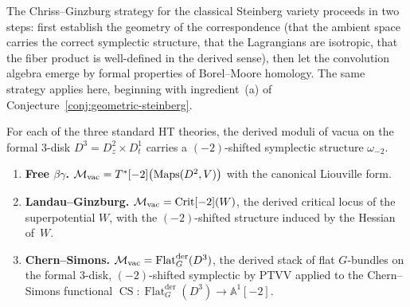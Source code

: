 The Chriss--Ginzburg strategy for the classical Steinberg variety
proceeds in two steps: first establish the geometry of the
correspondence (that the ambient space carries the correct symplectic
structure, that the Lagrangians are isotropic, that the fiber product
is well-defined in the derived sense), then let the convolution
algebra emerge by formal properties of Borel--Moore homology.
The same strategy applies here, beginning with ingredient~(a) of
Conjecture~\ref{conj:geometric-steinberg}.

\begin{proposition}
\label{prop:minus-two-shifted-examples}
\ClaimStatusProvedHere
For each of the three standard HT theories, the derived moduli of
vacua on the formal $3$-disk $D^3 = D^2_z \times D^1_t$ carries a
$(-2)$-shifted symplectic structure $\omega_{-2}$.
\begin{enumerate}[label=\textup{(\roman*)},leftmargin=2em]
\item \textbf{Free $\beta\gamma$.}
 $\mathcal M_{\mathrm{vac}} = T^*[-2]\bigl(\operatorname{Maps}(D^2, V)\bigr)$
 with the canonical Liouville form.

\item \textbf{Landau--Ginzburg.}
 $\mathcal M_{\mathrm{vac}} = \operatorname{Crit}[-2](W)$, the derived
 critical locus of the superpotential $W$, with the $(-2)$-shifted
 structure induced by the Hessian of~$W$.

\item \textbf{Chern--Simons.}
 $\mathcal M_{\mathrm{vac}} = \operatorname{Flat}_G^{\mathrm{der}}(D^3)$,
 the derived stack of flat $G$-bundles on the formal $3$-disk,
 $(-2)$-shifted symplectic by PTVV \cite{PTVV13} applied to the
 Chern--Simons functional $\operatorname{CS} \colon
 \operatorname{Flat}_G^{\mathrm{der}}(D^3) \to \mathbb{A}^1[-2]$.
\end{enumerate}
\end{proposition}

